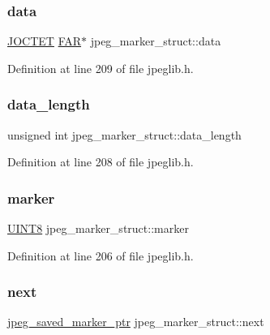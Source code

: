 \subsubsection{\texorpdfstring{data}{data}}
{\footnotesize\ttfamily \mbox{\hyperlink{jmorecfg_8h_a356ad249f20e691b520da439f92cccbc}{J\+O\+C\+T\+ET}} \mbox{\hyperlink{jmorecfg_8h_aef060b3456fdcc093a7210a762d5f2ed}{F\+AR}}$\ast$ jpeg\+\_\+marker\+\_\+struct\+::data}



Definition at line 209 of file jpeglib.\+h.

\mbox{\label{structjpeg__marker__struct_a98412e9bccde6954ce55f611ad146a6b}} 
\subsubsection{\texorpdfstring{data\_length}{data\_length}}
{\footnotesize\ttfamily unsigned int jpeg\+\_\+marker\+\_\+struct\+::data\+\_\+length}



Definition at line 208 of file jpeglib.\+h.

\mbox{\label{structjpeg__marker__struct_a154cf70fc9b4f86da631ca08a12a8d33}} 
\subsubsection{\texorpdfstring{marker}{marker}}
{\footnotesize\ttfamily \mbox{\hyperlink{jmorecfg_8h_adfb9a8ea1dd59f151065f763e1e9acd6}{U\+I\+N\+T8}} jpeg\+\_\+marker\+\_\+struct\+::marker}



Definition at line 206 of file jpeglib.\+h.

\mbox{\label{structjpeg__marker__struct_a1cb619806ea91b42a46b2a04fafabd82}} 
\subsubsection{\texorpdfstring{next}{next}}
{\footnotesize\ttfamily \mbox{\hyperlink{jpeglib_8h_a2efb5205b3e81589f2dc133f1a412bb0}{jpeg\+\_\+saved\+\_\+marker\+\_\+ptr}} jpeg\+\_\+marker\+\_\+struct\+::next}



